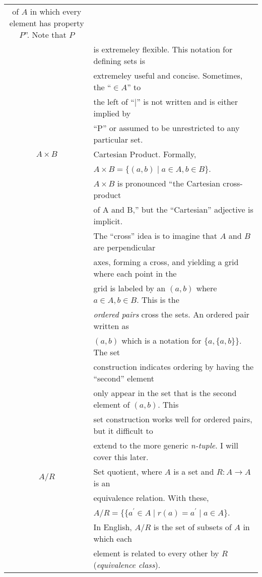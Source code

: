 \documentclass{article}
\newcommand{\p}{^\prime}
\begin{document}
\begin{tabular}{c|l}
			of $A$ in which every element has property $P$''. Note that $P$ \\&
			is extremeley flexible. This notation for defining sets is \\&
			extremeley useful and concise. Sometimes, the ``$\in A$'' to \\&
			the left of ``$\mid$'' is not written and is either implied by \\&
			``P'' or assumed to be unrestricted to any particular set.
		\\\hline
		$A \times B$ &
			Cartesian Product. Formally, \\&
			$A \times B = \{ (a,b) \mid a \in A, b \in B \}$. \\&
			$A \times B$ is pronounced ``the Cartesian cross-product \\&
			of A and B,'' but the ``Cartesian'' adjective is implicit.\\&
			The ``cross'' idea is to imagine that $A$ and $B$ are perpendicular \\&
			axes, forming a cross, and yielding a grid where each point in the \\&
			grid is labeled by an $(a,b)$ where $a \in A, b \in B$. This is the \\&
			\textit{ordered pairs} cross the sets. An ordered pair written as \\&
			$(a,b)$ which is a notation for $\{ a , \{a, b\}\}$. The set \\&
			construction indicates ordering by having the ``second'' element \\&
			only appear in the set that is the second element of $(a,b)$. This \\&
			set construction works well for ordered pairs, but it difficult to \\&
			extend to the more generic \textit{n-tuple}. I will cover this later.
		\\\hline
		$A / R$ &
			Set quotient, where $A$ is a set and $R : A \rightarrow A$ is an \\&
			equivalence relation. With these, \\&
			$A / R = \{ \{ a\p \in A \mid r(a) = a\p \mid a \in A \}$. \\&
			In English, $A/R$ is the set of subsets of $A$ in which each \\&
			element is related to every other by $R$ (\textit{equivalence class}).
	\end{tabular}
\end{document}
